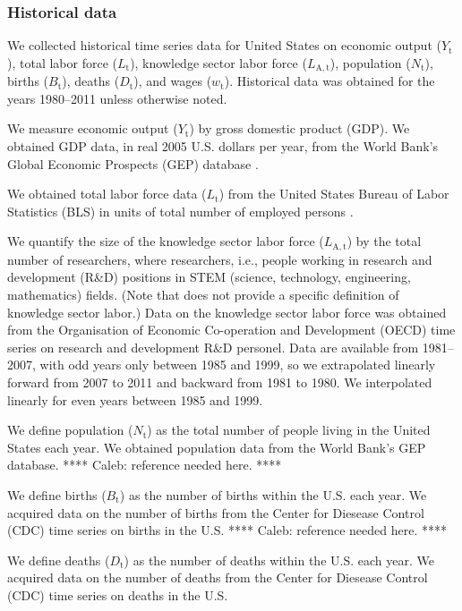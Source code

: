 \documentclass[letterpaper,12pt]{article}
\begin{document}
\subsubsection{Historical data}
\label{sec:basic_model_historical_data}

We collected historical time series data for United States on economic output ($Y_\mathrm{t}$), total labor force ($L_\mathrm{t}$), knowledge sector labor force ($L_\mathrm{A,t}$), population ($N_\mathrm{t}$), births ($B_\mathrm{t}$), deaths ($D_\mathrm{t}$), and wages ($w_\mathrm{t}$). Historical data was obtained for the years 1980--2011 unless otherwise noted. 

We measure economic output ($Y_\mathrm{t}$) by gross domestic product (GDP). We obtained GDP data, in real 2005 U.S. dollars per year, from the World Bank's Global Economic Prospects (GEP) database \citep{WorldBankGEP:2013a}.

We obtained total labor force data ($L_\mathrm{t}$) from the United States Bureau of Labor Statistics (BLS) in units of total number of employed persons \citep{BLS:2013a}. 

We quantify the size of the knowledge sector labor force ($L_\mathrm{A,t}$) by the total number of researchers, where researchers, i.e., people working in research and development (R\&D) positions in STEM (science, technology, engineering, mathematics) fields. (Note that \citet{Jones:2001wn} does not provide a specific definition of knowledge sector labor.) Data on the knowledge sector labor force was obtained from the Organisation of Economic Co-operation and Development (OECD) time series on research and development R\&D personel. Data are available from 1981--2007, with odd years only between 1985 and 1999, so we extrapolated linearly forward from 2007 to 2011 and backward from 1981 to 1980. We interpolated linearly for even years between 1985 and 1999.

We define population ($N_\mathrm{t}$) as the total number of people living in the United States each year. We obtained population data from the World Bank's GEP database. **** Caleb: reference needed here. ****

We define births ($B_\mathrm{t}$) as the number of births within the U.S. each year. We acquired data on the number of births from the Center for Diesease Control (CDC) time series on births in the U.S. **** Caleb: reference needed here. **** 

We define deaths ($D_\mathrm{t}$) as the number of deaths within the U.S. each year. We acquired data on the number of deaths from the Center for Diesease Control (CDC) time series on deaths in the U.S.
\end{document}
